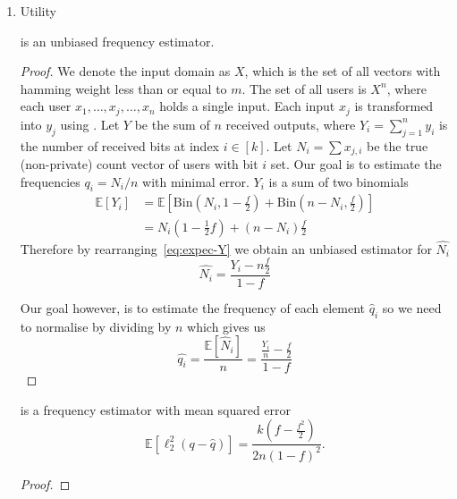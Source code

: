 \documentclass{article}
\begin{document}
\begin{enumerate}
\begin{proof}
\end{proof}
\item Utility
\begin{theorem}
\label{thm:unbiased-estimator}
	 is an unbiased frequency estimator.
\end{theorem}
\begin{proof} We denote the input domain as $X$, which is the set of all vectors with hamming weight less than or equal to $m$. The set of all users is $X^n$, where each user $x_1,\ldots,x_j,\ldots,x_n$ holds a single input. Each input $x_j$ is transformed into $y_j$ using . Let $Y$ be the sum of $n$ received outputs, where $Y_i=\sum_{j=1}^n y_i$ is the number of received bits at index $i\in [k]$. Let $N_i=\sum x_{j,i}$ be the true (non-private) count vector of users with bit $i$ set. Our goal is to estimate the frequencies $q_i=N_i/n$ with minimal error. $Y_i$ is a sum of two binomials
\begin{align}
\mathbb{E}[Y_i] &= \mathbb{E}\left[\text{Bin}\left(N_i,1-\frac{f}{2}\right)+\text{Bin}\left(n-N_i,\frac{f}{2}\right)\right]\label{eq:YsumBin}\\
    &=N_i\left(1-\frac{1}{2}f\right) + (n-N_i)\frac{f}{2}\label{eq:expec-Y}
\end{align}
Therefore by rearranging~\ref{eq:expec-Y} we obtain an unbiased estimator for $\hat{N_i}$
\begin{equation}
    \label{eq:estimator}
    \hat{N_i} = \frac{Y_i-n\frac{f}{2}}{1-f}
\end{equation}

Our goal however, is to estimate the frequency of each element $\hat{q}_i$ so we need to normalise by dividing by $n$ which gives us
\[
\hat{q_i}=\frac{\mathbb{E}[\hat{N}_i]}{n} = \frac{\frac{Y_i}{n}-\frac{f}{2}}{1-f}
\]
\end{proof}
\begin{theorem}
	 is a frequency estimator with mean squared error
	\begin{equation*}
		\mathbb{E}[\ell_2^2(q-\hat{q})] = \frac{k\left(f-\frac{f^2}{2}\right)}{2n(1-f)^2}.
	\end{equation*}
\end{theorem}
\begin{proof}\hfill


\end{proof}
\end{enumerate}
\end{document}
